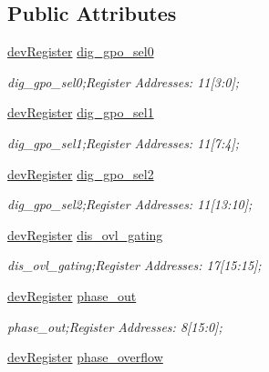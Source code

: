 \subsection*{Public Attributes}
\begin{DoxyCompactItemize}
\item 
\mbox{\hyperlink{classdev_register}{dev\+Register}} \mbox{\hyperlink{class_o_p_t3101_registers_acd7195bc7b0e9f0ff1bef55b76209f61}{dig\+\_\+gpo\+\_\+sel0}}
\begin{DoxyCompactList}\small\item\em dig\+\_\+gpo\+\_\+sel0;Register Addresses\+: 11\mbox{[}3\+:0\mbox{]}; \end{DoxyCompactList}\item 
\mbox{\hyperlink{classdev_register}{dev\+Register}} \mbox{\hyperlink{class_o_p_t3101_registers_ada3dd63d8a141bf2ebb3593b80ac99d8}{dig\+\_\+gpo\+\_\+sel1}}
\begin{DoxyCompactList}\small\item\em dig\+\_\+gpo\+\_\+sel1;Register Addresses\+: 11\mbox{[}7\+:4\mbox{]}; \end{DoxyCompactList}\item 
\mbox{\hyperlink{classdev_register}{dev\+Register}} \mbox{\hyperlink{class_o_p_t3101_registers_aee93db1ca418596c4fe0225a329e4316}{dig\+\_\+gpo\+\_\+sel2}}
\begin{DoxyCompactList}\small\item\em dig\+\_\+gpo\+\_\+sel2;Register Addresses\+: 11\mbox{[}13\+:10\mbox{]}; \end{DoxyCompactList}\item 
\mbox{\hyperlink{classdev_register}{dev\+Register}} \mbox{\hyperlink{class_o_p_t3101_registers_a5bc564dfa966d9f0f4f68ef98e378305}{dis\+\_\+ovl\+\_\+gating}}
\begin{DoxyCompactList}\small\item\em dis\+\_\+ovl\+\_\+gating;Register Addresses\+: 17\mbox{[}15\+:15\mbox{]}; \end{DoxyCompactList}\item 
\mbox{\hyperlink{classdev_register}{dev\+Register}} \mbox{\hyperlink{class_o_p_t3101_registers_ab115ec048574d0095fbe084be88936c9}{phase\+\_\+out}}
\begin{DoxyCompactList}\small\item\em phase\+\_\+out;Register Addresses\+: 8\mbox{[}15\+:0\mbox{]}; \end{DoxyCompactList}\item 
\mbox{\hyperlink{classdev_register}{dev\+Register}} \mbox{\hyperlink{class_o_p_t3101_registers_a228ab6e912760cc969dd4782db40db5b}{phase\+\_\+overflow}}

\end{DoxyCompactItemize}
